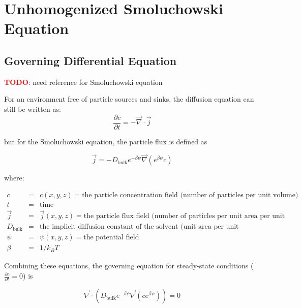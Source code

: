 
\section{Unhomogenized Smoluchowski Equation}\label{sec:unhom_smol}

\subsection{Governing Differential Equation}\label{subsec:unhom_smol_gov}

\textcolor{red}{\textbf{TODO}}: need reference for Smoluchowski equation

For an environment free of particle sources and sinks,
the diffusion equation can still be written as:
\begin{equation}
  \frac{\partial c}{\partial t} = - \vec{\nabla} \cdot \vec{j}
\end{equation}

but for the Smoluchowski equation, the particle flux is defined as

\begin{equation}
  \vec{j} = - D_{\mathrm{bulk}} e^{-\beta \psi} \vec{\nabla} \left( e^{\beta \psi} c \right)
\end{equation}

where:

$\begin{array}{rcl}
c & = & c(x,y,z) = \text{the particle concentration field (number of particles per unit volume)} \\
t & = & \text{time} \\
\vec{j} & = & \vec{j}(x,y,z) = \text{the particle flux field (number of particles per unit area per unit time)} \\
D_{\mathrm{bulk}} & = & \text{the implicit diffusion constant of the solvent (unit area per unit time)} \\
\psi & = & \psi(x,y,z) = \text{the potential field} \\
\beta & = & 1/k_B T
\end{array}$

Combining these equations, the governing equation for steady-state conditions ($\frac{\partial c}{\partial t} = 0$) is

\begin{equation}
  \vec{\nabla} \cdot \left( D_{\mathrm{bulk}} e^{-\beta \psi} \vec{\nabla} \left( c e^{\beta \psi} \right) \right) = 0
\end{equation}

